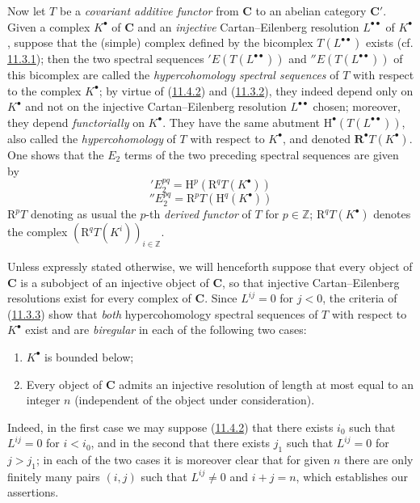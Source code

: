 \begin{env}[11.4.3]
\label{0.11.4.3}
Now let $T$ be a \emph{covariant additive functor} from $\boldsymbol{C}$
to an abelian category $\boldsymbol{C}'$. Given a complex
$K^\bullet$ of $\boldsymbol{C}$ and an \emph{injective} Cartan--Eilenberg resolution
$L^{\bullet\bullet}$ of $K^\bullet$, suppose that the (simple) complex defined
by the bicomplex $T(L^{\bullet\bullet})$ exists
(cf. \hyperref[0.11.3.1]{11.3.1}); then the two spectral sequences
$'E(T(L^{\bullet\bullet}))$ and $''E(T(L^{\bullet\bullet}))$ of this bicomplex
are called the \emph{hypercohomology spectral sequences} of $T$ with respect to the
complex $K^\bullet$; by virtue of
(\hyperref[0.11.4.2]{11.4.2}) and
(\hyperref[0.11.3.2]{11.3.2}), they indeed depend only on
$K^\bullet$ and not on the injective Cartan--Eilenberg resolution
$L^{\bullet\bullet}$ chosen; moreover, they depend
\emph{functorially} on $K^\bullet$. They have the same abutment
$\mathrm H^\bullet(T(L^{\bullet\bullet}))$, also called
the \emph{hypercohomology} of $T$ with respect to $K^\bullet$, and denoted
$\mathbf R^\bullet T(K^\bullet)$. One shows that the $E_2$ terms of the two
preceding spectral sequences are given by
\[
  \label{0.11.4.3.1}
  'E_2^{pq}=\mathrm H^p(\mathrm R^qT(K^\bullet))
  \tag{11.4.3.1}
\]
\[
  \label{0.11.4.3.2}
  ''E_2^{pq}=\mathrm R^pT(\mathrm H^q(K^\bullet))
  \tag{11.4.3.2}
\]
$\mathrm R^pT$ denoting as usual the $p$-th \emph{derived
functor} of $T$ for $p\in\mathbb Z$; $\mathrm R^qT(K^\bullet)$ denotes the
complex $(\mathrm R^qT(K^i))_{i\in\mathbb Z}$.

Unless expressly stated otherwise, we will henceforth suppose that every object
of $\boldsymbol{C}$ is a subobject of an injective object of $\boldsymbol{C}$, so
that injective Cartan--Eilenberg resolutions exist for every complex
of $\boldsymbol{C}$. Since $L^{ij}=0$ for $j<0$, the criteria of
(\hyperref[0.11.3.3]{11.3.3}) show that \emph{both} hypercohomology
spectral sequences of $T$ with respect to $K^\bullet$ exist and
are \emph{biregular} in each of the following two cases:
\begin{enumerate}
  \item[$1^\circ$] $K^\bullet$ is bounded below;
  \item[$2^\circ$] Every object of $\boldsymbol{C}$ admits an injective resolution
    of length at most equal to an integer $n$ (independent of the object
    under consideration).
\end{enumerate}
Indeed, in the first case we may suppose
(\hyperref[0.11.4.2]{11.4.2}) that there exists $i_0$ such that $L^{ij}=0$ for
$i<i_0$, and in the second that there exists $j_1$ such that $L^{ij}=0$ for $j>j_1$;
in each of the two cases it is moreover clear that for given $n$ there are
only finitely many pairs $(i,j)$ such that $L^{ij}\neq0$ and $i+j=n$, which
establishes our assertions.


\end{env}
